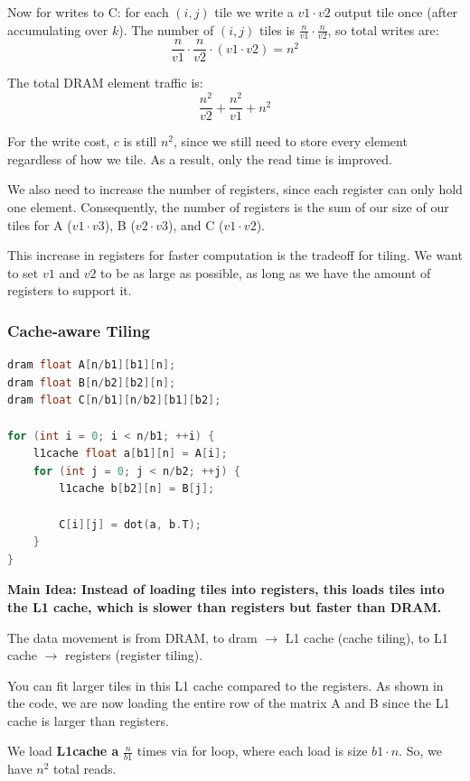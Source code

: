 \documentclass[twoside]{article}
\begin{document}
Now for writes to C: for each $(i, j)$ tile we write a $v1 \cdot v2$ output tile once (after accumulating over $k$). The number of $(i, j)$ tiles is $\frac{n}{v1} \cdot \frac{n}{v2}$, so total writes are:
$$
\frac{n}{v1} \cdot \frac{n}{v2} \cdot (v1 \cdot v2) = n^2
$$

The total DRAM element traffic is:
$$
\frac{n^2}{v2} + \frac{n^2}{v1} + n^2
$$

For the write cost, $c$ is still $n^2$, since we still need to store every element regardless of how we tile. As a result, only the read time is improved.

We also need to increase the number of registers, since each register can only hold one element. Consequently, the number of registers is the sum of our size of our tiles for A ($v1 \cdot v3$), B ($v2 \cdot v3$), and C ($v1 \cdot v2$).

This increase in registers for faster computation is the tradeoff for tiling. We want to set $v1$ and $v2$ to be as large as possible, as long as we have the amount of registers to support it.

\subsubsection{Cache-aware Tiling}
\begin{lstlisting}[language=C++]
dram float A[n/b1][b1][n];
dram float B[n/b2][b2][n];
dram float C[n/b1][n/b2][b1][b2];

for (int i = 0; i < n/b1; ++i) {
    l1cache float a[b1][n] = A[i];
    for (int j = 0; j < n/b2; ++j) {
        l1cache b[b2][n] = B[j];
        
        C[i][j] = dot(a, b.T);
    }
}
\end{lstlisting}

\textbf{Main Idea: Instead of loading tiles into registers, this loads tiles into the L1 cache, which is slower than registers but faster than DRAM.}

The data movement is from DRAM, to dram $\rightarrow$ L1 cache (cache tiling), to L1 cache $\rightarrow$ registers (register tiling).

You can fit larger tiles in this L1 cache compared to the registers. As shown in the code, we are now loading the entire row of the matrix A and B since the L1 cache is larger than registers.

We load \textbf{L1cache a} $\frac{n}{b1}$ times via for loop, where each load is size $b1 \cdot n$. So, we have $n^2$ total reads.
\end{document}
